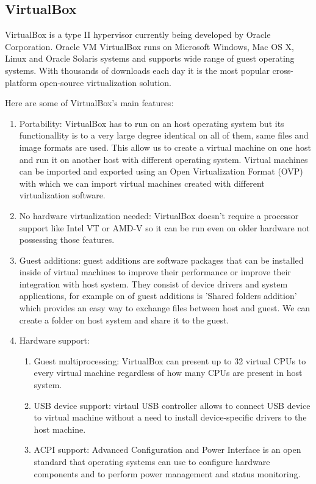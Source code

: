 \begin{enumerate}
\section{VirtualBox}
VirtualBox is a type II hypervisor currently being developed by Oracle Corporation. Oracle VM VirtualBox runs on Microsoft Windows, Mac OS X, Linux and Oracle Solaris systems and supports wide range of guest operating systems. With thousands of downloads each day it is the most popular cross-platform open-source virtualization solution.

Here are some of VirtualBox's main features:
\begin{enumerate}
\item Portability: VirtualBox has to run on an host operating system but its functionallity is to a very large degree identical on all of them, same files and image formats are used. This allow us to create a virtual machine on one host and run it on another host with different operating system. Virtual machines can be imported and exported using an Open Virtualization Format (OVP) with which we can import virtual machines created with different virtualization software.
\item No hardware virtualization needed: VirtualBox doesn't require a processor support like Intel VT or AMD-V so it can be run even on older hardware not possessing those features.
\item Guest additions: guest additions are software packages that can be installed inside of virtual machines to improve their performance or improve their integration with host system. They consist of device drivers and system applications, for example on of guest additions is 'Shared folders addition' which provides an easy way to exchange files between host and guest. We can create a folder on host system and share it to the guest.
\item Hardware support:
\begin{enumerate}
\item Guest multiprocessing: VirtualBox can present up to 32 virtual CPUs to every virtual machine regardless of how many CPUs are present in host system.
\item USB device support: virtaul USB controller allows to connect USB device to virtual machine without a need to install device-specific drivers to the host machine.
\item ACPI support: Advanced Configuration and Power Interface is an open standard that operating systems can use to configure hardware components and to perform power management and status monitoring.

\end{enumerate}
\end{enumerate}
\end{enumerate}
